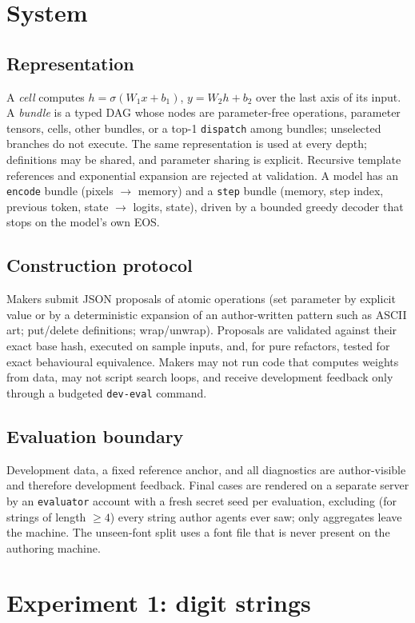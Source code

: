 \documentclass[11pt]{article}
\begin{document}
\section{System}
\subsection{Representation}
A \emph{cell} computes $h=\sigma(W_1x+b_1)$, $y=W_2h+b_2$ over the last axis of its input.
A \emph{bundle} is a typed DAG whose nodes are parameter-free operations, parameter tensors,
cells, other bundles, or a top-1 \texttt{dispatch} among bundles; unselected branches do not
execute. The same representation is used at every depth; definitions may be shared, and
parameter sharing is explicit. Recursive template references and exponential expansion are
rejected at validation. A model has an \texttt{encode} bundle (pixels $\to$ memory) and a
\texttt{step} bundle (memory, step index, previous token, state $\to$ logits, state), driven
by a bounded greedy decoder that stops on the model's own EOS.

\subsection{Construction protocol}
Makers submit JSON proposals of atomic operations (set parameter by explicit value or by a
deterministic expansion of an author-written pattern such as ASCII art; put/delete
definitions; wrap/unwrap). Proposals are validated against their exact base hash, executed on
sample inputs, and, for pure refactors, tested for exact behavioural equivalence. Makers may
not run code that computes weights from data, may not script search loops, and receive
development feedback only through a budgeted \texttt{dev-eval} command.

\subsection{Evaluation boundary}
Development data, a fixed reference anchor, and all diagnostics are author-visible and
therefore development feedback. Final cases are rendered on a separate server by an
\texttt{evaluator} account with a fresh secret seed per evaluation, excluding (for strings of
length $\geq4$) every string author agents ever saw; only aggregates leave the machine.
The unseen-font split uses a font file that is never present on the authoring machine.

\section{Experiment 1: digit strings}
\end{document}
